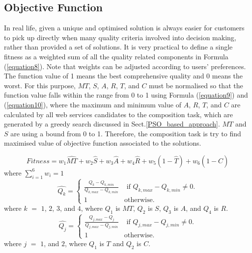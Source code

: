 \documentclass{llncs}
\begin{document}
\subsection{Objective Function}
In real life, given a unique and optimised solution is always easier for customers to pick up directly when many quality criteria involved into decision making, rather than provided a set of solutions. It is very practical to define a single fitness as a weighted sum of all the quality related components in Formula (\ref{equation8}). Note that weights can be adjusted according to users' preferences. The function value of 1 means the best comprehensive quality and 0 means the worst. For this purpose, $MT$, $S$, $A$, $R$, $T$, and $C$ must be normalised so that the function value falls within the range from 0 to 1 using Formula (\ref{equation9}) and (\ref{equation10}), where the maximum and minimum value of $A$, $R$, $T$, and $C$ are calculated by all web services candidates to the composition task, which are generated by a greedy search discussed in Sect.\ref{PSO_based_approach}. $MT$ and $S$ are using a bound from 0 to 1. Therefore, the composition task is try to find maximised value of objective function associated to the solutions.

\vspace{-0.2cm}
\begin{equation}
\label{equation8}
Fitness = w_1 \hat{MT} + w_2 \hat{S} + w_3 \hat{A} + w_4 \hat{R} + w_5(1 - \hat{T}) + w_6(1 - \hat{C})
\end{equation}
\noindent where $\sum_{i=1}^{6} w_i = 1$
\\
\vspace{-0.2cm}
\begin{equation}
\label{equation9}
\hat{Q_k} = 
\begin{cases}
	\frac{Q_k - Q_{k, min}}{Q_{k, max} - Q_{k, min}} & \text{ if }Q_{k, max} - Q_{k, min} \neq 0.\\
	1 & \mathrm{ otherwise}.
\end{cases}
\end{equation}
\noindent where $k$ $=$ $1$, $2$, $3$, and $4$, where $Q_1$ is $MT$, $Q_2$ is $S$, $Q_3$ is $A$, and $Q_4$ is $R$.
\begin{equation}
\label{equation10}
\hat{Q_j} = 
\begin{cases}
	\frac{Q_{j,max} - Q_j}{Q_{j, max} - Q_{j, min}} & \text{ if }Q_{j, max} - Q_{j, min} \neq 0.\\
	1 & \mathrm{ otherwise}.
\end{cases}
\end{equation}
\noindent where $j$ $=$ $1$, and $2$, where $Q_1$ is $T$ and $Q_2$ is $C$.
\end{document}
